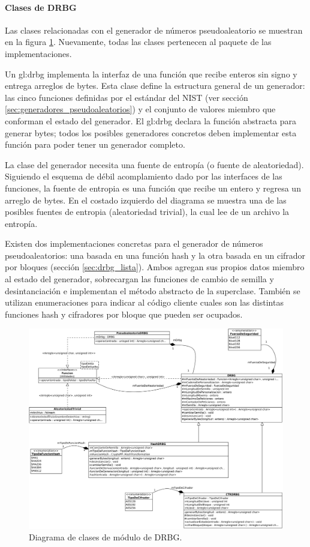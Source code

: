 %
%
%

\paragraph{Clases de DRBG}
\label{sec:drbg_disenio}

Las clases relacionadas con el generador de números pseudoaleatorio se muestran
en la figura \ref{clases_drbg}. Nuevamente, todas las clases pertenecen al
paquete de las implementaciones.

Un \gls{gl:drbg} implementa la interfaz de una función que recibe enteros sin
signo y entrega arreglos de bytes. Esta clase define la estructura general de un
generador: las cinco funciones definidas por el estándar del NIST (ver sección
\ref{sec:generadores_pseudoaleatorios}) y el conjunto de valores miembro que
conforman el estado del generador. El \gls{gl:drbg} declara la función abstracta
para generar bytes; todos los posibles generadores concretos deben implementar
esta función para poder tener un generador completo.

La clase del generador necesita una fuente de entropía (o fuente de
aleatoriedad). Siguiendo el esquema de débil acomplamiento dado por las
interfaces de las funciones, la fuente de entropia es una función que recibe un
entero y regresa un arreglo de bytes. En el costado izquierdo del diagrama se
muestra una de las posibles fuentes de entropia (aleatoriedad trivial), la cual
lee de un archivo la entropía.

Existen dos implementaciones concretas para el generador de números
pseudoaleatorios: una basada en una función hash y la otra basada en un cifrador
por bloques (sección \ref{sec:drbg_lista}). Ambos agregan sus propios datos
miembro al estado del generador, sobrecargan las funciones de cambio de semilla
y desintanciación e implementan el método abstracto de la superclase. También se
utilizan enumeraciones para indicar al código cliente cuales son las distintas
funciones hash y cifradores por bloque que pueden ser ocupados.

\begin{figure}
  \begin{center}
    \includegraphics[width=0.8\linewidth]{diagramas/drbg.png}
    \caption{Diagrama de clases de módulo de DRBG.}
    \label{clases_drbg}
  \end{center}
\end{figure}
